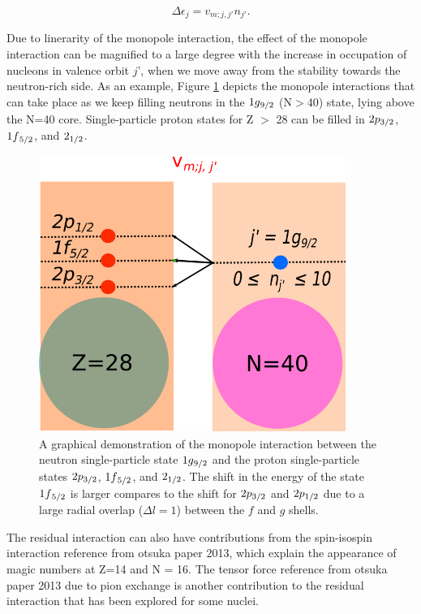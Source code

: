 \begin{equation}
\Delta \epsilon_{j} = v_{m;j,j'}n_{j'}.
\end{equation}


Due to linerarity of the monopole interaction, the effect of the monopole interaction can be magnified to a large degree with the increase in occupation of nucleons in valence orbit $\textit{j'}$, when we move away from the stability towards the neutron-rich side. As an example, Figure \ref{fig:monopole_interaction} depicts the monopole interactions that can take place as we keep filling neutrons in the $1g\textsubscript{9/2}$ (N$>$40) state, lying above the N=40 core. Single-particle proton states for Z $>$ 28 can be filled in $2p\textsubscript{3/2}$, $1f\textsubscript{5/2}$, and $2\textsubscript{1/2}$. 

\begin{figure}[h!]
	\centering
	\includegraphics[width=10cm,height=9cm]{figures/monopole_text.png}
	\caption[A graphical demonstration of the monopole interaction between the neutron single-particle state ]{A graphical demonstration of the monopole interaction between the neutron single-particle state $1g\textsubscript{9/2}$ and the proton single-particle states $2p\textsubscript{3/2}$, $1f\textsubscript{5/2}$, and $2\textsubscript{1/2}$. The shift in the energy of the state $1f\textsubscript{5/2}$ is larger compares to the shift for $2p\textsubscript{3/2}$ and $2p\textsubscript{1/2}$ due to a large radial overlap ($\Delta l = 1$) between the $\textit{f}$ and $\textit{g}$ shells. }
	\label{fig:monopole_interaction}
\end{figure}
The residual interaction can also have contributions from the spin-isospin interaction {reference from otsuka paper 2013}, which explain the appearance of magic numbers at Z=14 and N = 16. The tensor force {reference from otsuka paper 2013} due to pion exchange is another contribution to the residual interaction that has been explored for some nuclei.

